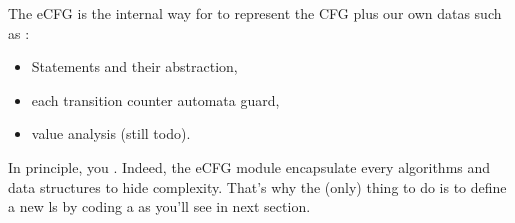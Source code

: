 The \gls{eCFG} is the internal way for \flatac to represent the  \gls{CFG} plus our own datas such as :
\begin{itemize}
	\item Statements and their abstraction,
	\item each transition counter automata guard,
	\item value analysis (still todo).
\end{itemize}


In principle, you . Indeed, the \gls{eCFG} module encapsulate every algorithms and data structures to hide complexity. That's why the (only) thing to do is to define a new \gls{ls} by coding a  as you'll see in next section.
